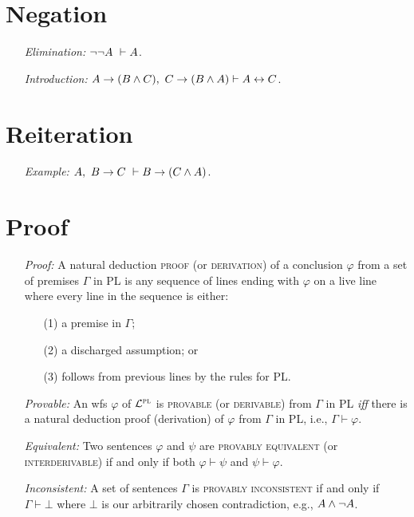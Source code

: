 \documentclass[a4paper, 11pt]{article} %
\begin{document}
\section*{Negation}

\begin{enumerate}
  \item[\it Elimination:] $\neg\neg A\ \vdash A$. 
  \item[\it Introduction:] $A \rightarrow (B \wedge C),\ C \rightarrow (B \wedge A) \vdash A \leftrightarrow C$.
\end{enumerate}


\section*{Reiteration}

\begin{enumerate}
  \item[\it Example:] $A,\ B \rightarrow C\ \vdash B \rightarrow (C \wedge A)$.
\end{enumerate}





\section*{Proof}

\begin{enumerate}
  \item[\it Proof:] A natural deduction \textsc{proof} (or \textsc{derivation}) of a conclusion $\varphi$ from a set of premises $\Gamma$ in PL is any sequence of lines ending with $\varphi$ on a live line where every line in the sequence is either:
      \begin{itemize}
        \item[(1)] a premise in $\Gamma$; 
        \item[(2)] a discharged assumption; or
        \item[(3)] follows from previous lines by the rules for PL.
      \end{itemize}
  \item[\it Provable:] An wfs $\varphi$ of $\mathcal{L}^{\textsc{pl}}$ is \textsc{provable} (or \textsc{derivable}) from $\Gamma$ in PL \textit{iff} there is a natural deduction proof (derivation) of $\varphi$ from $\Gamma$ in PL, i.e., $\Gamma \vdash \varphi$. 
  \item[\it Equivalent:] Two sentences $\varphi$ and $\psi$ are \textsc{provably equivalent} (or \textsc{interderivable}) if and only if both $\varphi\vdash\psi$ and $\psi\vdash\varphi$.
  \item[\it Inconsistent:] A set of sentences $\Gamma$ is \textsc{provably inconsistent} if and only if $\Gamma\vdash\bot$ where $\bot$ is our arbitrarily chosen contradiction, e.g., $A\wedge\neg A$.
\end{enumerate}
\end{document}

